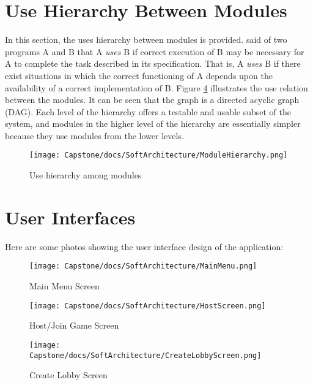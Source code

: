 \documentclass[12pt, titlepage]{article}
\begin{document}
\section{Use Hierarchy Between Modules} \label{SecUse}

In this section, the uses hierarchy between modules is
provided. \citet{Parnas1978} said of two programs A and B that A {\em uses} B if
correct execution of B may be necessary for A to complete the task described in
its specification. That is, A {\em uses} B if there exist situations in which
the correct functioning of A depends upon the availability of a correct
implementation of B.  Figure \ref{FigUH} illustrates the use relation between
the modules. It can be seen that the graph is a directed acyclic graph
(DAG). Each level of the hierarchy offers a testable and usable subset of the
system, and modules in the higher level of the hierarchy are essentially simpler
because they use modules from the lower levels.

\begin{figure}[H]
\centering
\texttt{[image: Capstone/docs/SoftArchitecture/ModuleHierarchy.png]}
\caption{Use hierarchy among modules}
\label{FigUH}
\end{figure}

\section{User Interfaces}
Here are some photos showing the user interface design of the application:

\begin{figure}[H]
\centering
\texttt{[image: Capstone/docs/SoftArchitecture/MainMenu.png]}
\caption{Main Menu Screen}
\label{FigUH}
\end{figure}

\begin{figure}[H]
\centering
\texttt{[image: Capstone/docs/SoftArchitecture/HostScreen.png]}
\caption{Host/Join Game Screen}
\label{FigUH}
\end{figure}

\begin{figure}[H]
\centering
\texttt{[image: Capstone/docs/SoftArchitecture/CreateLobbyScreen.png]}
\caption{Create Lobby Screen}
\label{FigUH}
\end{figure}
\end{document}
